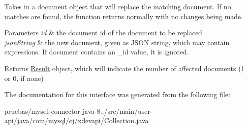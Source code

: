 Takes in a document object that will replace the matching document. If no matches are found, the function returns normally with no changes being made.


\begin{DoxyParams}{Parameters}
{\em id} & the document id of the document to be replaced \\
\hline
{\em json\+String} & the new document, given as J\+S\+ON string, which may contain expressions. If document contains an \+\_\+id value, it is ignored. \\
\hline
\end{DoxyParams}
\begin{DoxyReturn}{Returns}
\mbox{\hyperlink{interfacecom_1_1mysql_1_1cj_1_1xdevapi_1_1_result}{Result}} object, which will indicate the number of affected documents (1 or 0, if none) 
\end{DoxyReturn}


The documentation for this interface was generated from the following file\+:\begin{DoxyCompactItemize}
\item 
pruebas/mysql-\/connector-\/java-\/8../src/main/user-\/api/java/com/mysql/cj/xdevapi/Collection.\+java\end{DoxyCompactItemize}
